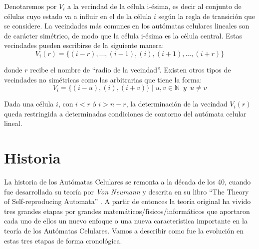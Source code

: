 Denotaremos por $V_i$ a la vecindad de la célula i-ésima, es decir al conjunto de células cuyo estado va a influir en el de la célula $i$ según la regla de transición que se considere. La vecindades más comunes en los autómatas celulares lineales son de carácter simétrico, de modo que la célula i-ésima es la célula central. Estas vecindades pueden escribirse de la siguiente manera:
$$V_i (r) = \lbrace (i-r), ... ,(i-1),(i),(i+1), ... ,(i+r)\rbrace$$

donde $r$ recibe el nombre de ``radio de la vecindad''. Existen otros tipos de vecindades no simétricas como las arbitrarias que tiene la forma:
$$V_i = \lbrace (i-u), (i), (i+v) \rbrace \mid u,v \in \mathbb{N} \enspace y \enspace u \ne v$$

Dada una célula $i$, con $i < r$ ó $i > n-r $, la determinación de la vecindad $V_i(r)$ queda restringida a determinadas condiciones de contorno del autómata celular lineal.

\section{Historia}
La historia de los Autómatas Celulares se remonta a la década de los 40, cuando fue desarrollada su teoría por \textit{Von Neumann} y descrita en su libro ``The Theory of Self-reproducing Automata'' \cite{Teoria_Von_neumann}.
A partir de entonces la teoría original ha vivido tres grandes etapas por grandes matemáticos/físicos/informáticos que aportaron cada uno de ellos un nuevo enfoque o una nueva característica importante en la teoría de los Autómatas Celulares.
Vamos a describir como fue la evolución en estas tres etapas de forma cronológica. 


